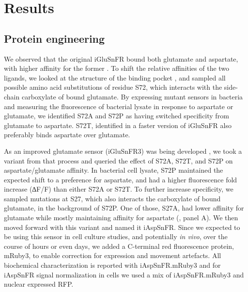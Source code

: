 \documentclass[9pt,lineno]{elife}
\begin{document}
\section{Results}

\subsection{Protein engineering}
We observed that the original iGluSnFR bound both glutamate and aspartate, with higher affinity for the former \citep{Marvin2013-qq}.
To shift the relative affinities of the two ligands, we looked at the structure of the binding pocket  \citep{Hu2008-nd}, and sampled all possible amino acid substitutions of residue S72, which interacts with the side-chain carboxylate of bound glutamate.
By expressing mutant sensors in bacteria and measuring the fluorescence of bacterial lysate in response to aspartate or glutamate, we identified S72A and S72P as having switched specificity from glutamate to aspartate.
S72T, identified in a faster version of iGluSnFR \citep{Helassa2018-fb} also preferably binds aspartate over glutamate.

As an improved glutamate sensor (iGluSnFR3) was being developed \citep{Aggarwal2023-pi}, we took a variant from that process and queried the effect of S72A, S72T, and S72P on aspartate/glutamate affinity.
In bacterial cell lysate, S72P maintained the expected shift to a preference for aspartate, and had a higher fluorescence fold increase (∆F/F) than either S72A or S72T.
To further increase specificity, we sampled mutations at S27, which also interacts the carboxylate of bound glutamate, in the background of S72P.
One of those, S27A, had lower affinity for glutamate while mostly maintaining affinity for aspartate (, panel A).
We then moved forward with this variant and named it iAspSnFR.
Since we expected to be using this sensor in cell culture studies, and potentially \textit{in vivo}, over the course of hours or even days, we added a C-terminal red fluorescence protein, mRuby3, to enable correction for expression and movement artefacts.
All biochemical characterization is reported with iAspSnFR.mRuby3 and for iAspSnFR signal normalization in cells we used a mix of iAspSnFR.mRuby3 and nuclear expressed RFP.
\end{document}
